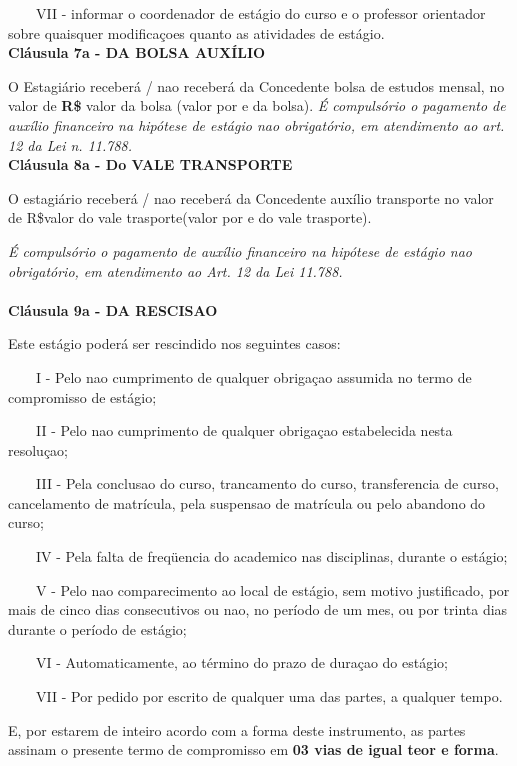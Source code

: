 \documentclass[10pt,a4paper]{article}
\begin{document}
\ \ \ \ VII - informar o coordenador de estágio do curso e o professor 
orientador sobre quaisquer modificaçoes quanto as atividades de estágio.
\\

\textbf{Cláusula 7a - DA BOLSA AUXÍLIO}

O Estagiário receberá / nao receberá da Concedente bolsa de estudos 
mensal, no valor de \textbf{R\$ }valor da bolsa
(valor por e da bolsa).
\textit{É compulsório o pagamento de auxílio financeiro na hipótese de 
estágio nao obrigatório, em atendimento ao art. 12 da Lei n. 11.788.}
\\

\textbf{Cláusula 8a - Do VALE TRANSPORTE}

O estagiário receberá / nao receberá da Concedente auxílio transporte no 
valor de R\$valor do vale trasporte(valor por e do vale trasporte).

\textit{É compulsório o pagamento de auxílio financeiro na hipótese de 
estágio nao obrigatório, em atendimento ao Art. 12 da Lei 11.788.}
\\\\






\textbf{Cláusula 9a - DA RESCISAO}

Este estágio poderá ser rescindido nos seguintes casos:

\ \ \ \ I - Pelo nao cumprimento de qualquer obrigaçao assumida no termo 
de compromisso de estágio;

\ \ \ \ II - Pelo nao cumprimento de qualquer obrigaçao estabelecida 
nesta resoluçao;

\ \ \ \ III - Pela conclusao do curso, trancamento do curso, 
transferencia de curso, cancelamento de matrícula, pela suspensao de 
matrícula ou pelo abandono do curso;

\ \ \ \ IV - Pela falta de freqüencia do academico nas disciplinas, 
durante o estágio;

\ \ \ \ V - Pelo nao comparecimento ao local de estágio, sem motivo 
justificado, por mais de cinco dias consecutivos ou nao, no período de 
um mes, ou por trinta dias durante o período de estágio;

\ \ \ \ VI - Automaticamente, ao término do prazo de duraçao do estágio;

\ \ \ \ VII - Por pedido por escrito de qualquer uma das partes, a 
qualquer tempo. 



E, por estarem de inteiro acordo com a forma deste instrumento, as 
partes assinam o presente termo de compromisso em \textbf{03 vias de 
igual teor e forma}.
\end{document}
